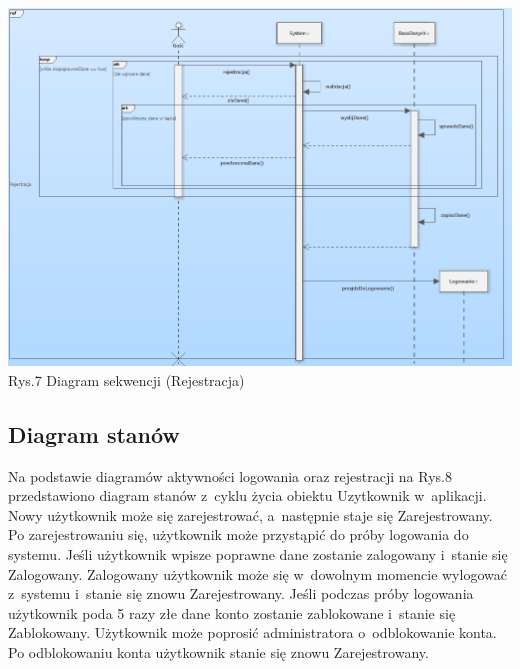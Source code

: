 \documentclass[12pt, letterpaper]{article}
\begin{document}
		\begin{center}
			\includegraphics[scale=0.6]{seqDiagramRejestracja}\\
			\caption{Rys.7 Diagram sekwencji (Rejestracja)}
		\end{center}
		
		\newpage		
		
		\subsection{Diagram stanów}
		
		Na podstawie diagramów aktywności logowania oraz rejestracji na Rys.8 przedstawiono diagram stanów z~cyklu życia obiektu Uzytkownik w~aplikacji.\\
		
		Nowy użytkownik może się zarejestrować, a~następnie staje się Zarejestrowany. Po zarejestrowaniu się, użytkownik może przystąpić do próby logowania do systemu. Jeśli użytkownik wpisze poprawne dane zostanie zalogowany i~stanie się Zalogowany. Zalogowany użytkownik może się w~dowolnym momencie wylogować z~systemu i~stanie się znowu Zarejestrowany. Jeśli podczas próby logowania użytkownik poda 5 razy złe dane konto zostanie zablokowane i~stanie się Zablokowany. Użytkownik może poprosić administratora o~odblokowanie konta. Po odblokowaniu konta użytkownik stanie się znowu Zarejestrowany.
		
\end{document}
